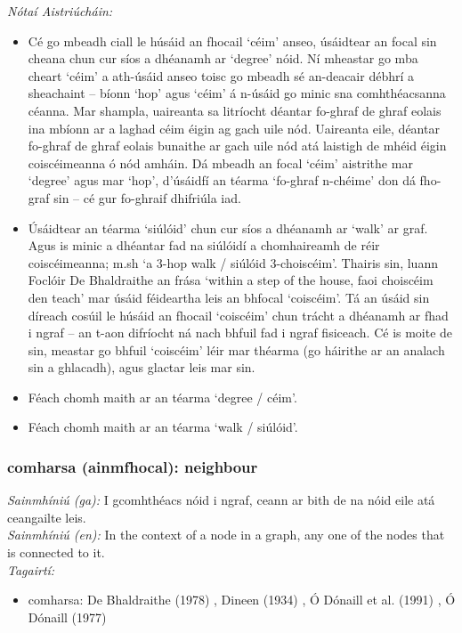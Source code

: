  \noindent \textit{Nótaí Aistriúcháin:}
\begin{itemize}
	\item Cé go mbeadh ciall le húsáid an fhocail `céim' anseo, úsáidtear an focal sin cheana chun cur síos a dhéanamh ar `degree' nóid. Ní mheastar go mba cheart `céim' a ath-úsáid anseo toisc go mbeadh sé an-deacair débhrí a sheachaint -- bíonn `hop' agus `céim' á n-úsáid go minic sna comhthéacsanna céanna. Mar shampla, uaireanta sa litríocht déantar fo-ghraf de ghraf eolais ina mbíonn ar a laghad céim éigin ag gach uile nód. Uaireanta eile, déantar fo-ghraf de ghraf eolais bunaithe ar gach uile nód atá laistigh de mhéid éigin coiscéimeanna ó nód amháin. Dá mbeadh an focal `céim' aistrithe mar `degree' agus mar `hop', d'úsáidfí an téarma `fo-ghraf n-chéime' don dá fho-graf sin -- cé gur fo-ghraif dhifriúla iad.
	\item Úsáidtear an téarma `siúlóid' chun cur síos a dhéanamh ar `walk' ar graf. Agus is minic a dhéantar fad na siúlóidí a chomhaireamh de réir coiscéimeanna; m.sh `a 3-hop walk / siúlóid 3-choiscéim'. Thairis sin, luann Foclóir De Bhaldraithe an frása `within a step of the house, faoi choiscéim den teach' mar úsáid féideartha leis an bhfocal `coiscéim'. Tá an úsáid sin díreach cosúil le húsáid an fhocail `coiscéim' chun trácht a dhéanamh ar fhad i ngraf -- an t-aon difríocht ná nach bhfuil fad i ngraf fisiceach. Cé is moite de sin, meastar go bhfuil `coiscéim' léir mar théarma (go háirithe ar an analach sin a ghlacadh), agus glactar leis mar sin.
	\item Féach chomh maith ar an téarma `degree / céim'.
	\item Féach chomh maith ar an téarma `walk / siúlóid'.
\end{itemize}


\subsubsection*{comharsa (ainmfhocal): neighbour}
 \noindent \textit{Sainmhíniú (ga):} I gcomhthéacs nóid i ngraf, ceann ar bith de na nóid eile atá ceangailte leis.
\\
 \noindent \textit{Sainmhíniú (en):} In the context of a node in a graph, any one of the nodes that is connected to it.
\\
 \noindent \textit{Tagairtí:}
\begin{itemize}
	\item comharsa: De Bhaldraithe (1978) \cite{de-bhaldraithe}, Dineen (1934) \cite{dineen}, Ó Dónaill et al. (1991) \cite{focloir-beag}, Ó Dónaill (1977) \cite{odonaill}
\end{itemize}

